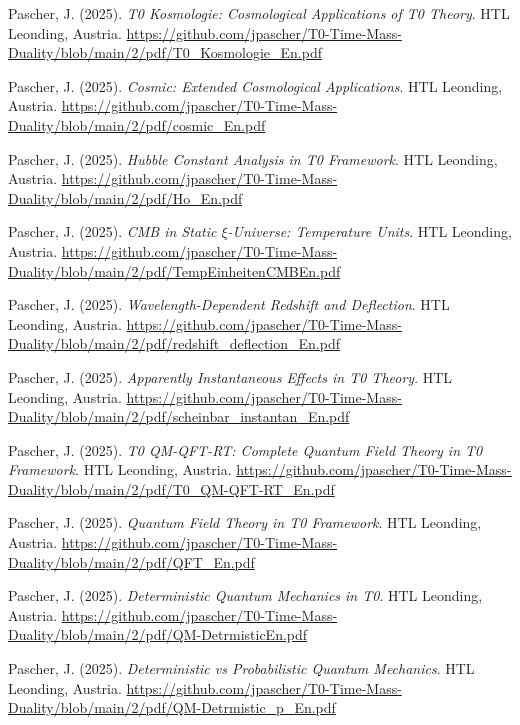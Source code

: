 \documentclass{article}
\begin{document}
\begin{thebibliography}{99}
		Pascher, J. (2025).
		\textit{T0 Kosmologie: Cosmological Applications of T0 Theory}.
		HTL Leonding, Austria.
		\url{https://github.com/jpascher/T0-Time-Mass-Duality/blob/main/2/pdf/T0_Kosmologie_En.pdf}
		
		Pascher, J. (2025).
		\textit{Cosmic: Extended Cosmological Applications}.
		HTL Leonding, Austria.
		\url{https://github.com/jpascher/T0-Time-Mass-Duality/blob/main/2/pdf/cosmic_En.pdf}
		
		Pascher, J. (2025).
		\textit{Hubble Constant Analysis in T0 Framework}.
		HTL Leonding, Austria.
		\url{https://github.com/jpascher/T0-Time-Mass-Duality/blob/main/2/pdf/Ho_En.pdf}
		
		Pascher, J. (2025).
		\textit{CMB in Static $\xi$-Universe: Temperature Units}.
		HTL Leonding, Austria.
		\url{https://github.com/jpascher/T0-Time-Mass-Duality/blob/main/2/pdf/TempEinheitenCMBEn.pdf}
		
		Pascher, J. (2025).
		\textit{Wavelength-Dependent Redshift and Deflection}.
		HTL Leonding, Austria.
		\url{https://github.com/jpascher/T0-Time-Mass-Duality/blob/main/2/pdf/redshift_deflection_En.pdf}
		
		Pascher, J. (2025).
		\textit{Apparently Instantaneous Effects in T0 Theory}.
		HTL Leonding, Austria.
		\url{https://github.com/jpascher/T0-Time-Mass-Duality/blob/main/2/pdf/scheinbar_instantan_En.pdf}
		
		
		Pascher, J. (2025).
		\textit{T0 QM-QFT-RT: Complete Quantum Field Theory in T0 Framework}.
		HTL Leonding, Austria.
		\url{https://github.com/jpascher/T0-Time-Mass-Duality/blob/main/2/pdf/T0_QM-QFT-RT_En.pdf}
		
		Pascher, J. (2025).
		\textit{Quantum Field Theory in T0 Framework}.
		HTL Leonding, Austria.
		\url{https://github.com/jpascher/T0-Time-Mass-Duality/blob/main/2/pdf/QFT_En.pdf}
		
		Pascher, J. (2025).
		\textit{Deterministic Quantum Mechanics in T0}.
		HTL Leonding, Austria.
		\url{https://github.com/jpascher/T0-Time-Mass-Duality/blob/main/2/pdf/QM-DetrmisticEn.pdf}
		
		Pascher, J. (2025).
		\textit{Deterministic vs Probabilistic Quantum Mechanics}.
		HTL Leonding, Austria.
		\url{https://github.com/jpascher/T0-Time-Mass-Duality/blob/main/2/pdf/QM-Detrmistic_p_En.pdf}
		

\end{thebibliography}
\end{document}
